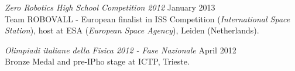 \documentclass[margin, 10pt]{res} %
\begin{document}
\begin{resume}
{\sl Zero Robotics High School Competition 2012} \hfill January 2013\\
Team ROBOVALL - European finalist in ISS Competition (\textit{International Space Station}), host at ESA (\textit{European Space Agency}), Leiden (Netherlands).

{\sl Olimpiadi italiane della Fisica 2012 - Fase Nazionale} \hfill April 2012\\
Bronze Medal and pre-IPho stage at ICTP, Trieste.











\end{resume}
\end{document}
